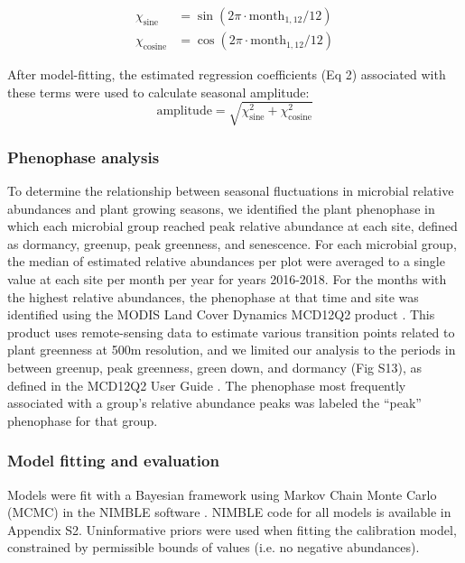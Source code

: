 \documentclass[11pt]{article}
\begin{document}
\begin{align}
\chi_\text{sine} &= \sin(2 \pi \cdot \text{month}_{1,12} / 12) \label{eq:sin_encoding} \\
\chi_\text{cosine} &= \cos(2 \pi \cdot \text{month}_{1,12} / 12) \label{eq:cos_encoding}
\end{align}


After model-fitting, the estimated regression coefficients (Eq 2) associated with these terms were used to calculate seasonal amplitude: \\

\begin{equation}
\text{amplitude} = \sqrt{\chi_\text{sine}^2 + \chi_\text{cosine}^2}
\label{eq:amplitude}
\end{equation}


\subsubsection{Phenophase analysis}

To determine the relationship between seasonal fluctuations in microbial relative abundances and plant growing seasons, we identified the plant phenophase in which each microbial group reached peak relative abundance at each site, defined as dormancy, greenup, peak greenness, and senescence. For each microbial group, the median of estimated relative abundances per plot were averaged to a single value at each site per month per year for years 2016-2018. For the months with the highest relative abundances, the phenophase at that time and site was identified using the MODIS Land Cover Dynamics MCD12Q2 product \cite{gray_user_nodate}. This product uses remote-sensing data to estimate various transition points related to plant greenness at 500m resolution, and we limited our analysis to the periods in between greenup, peak greenness, green down, and dormancy (Fig S13), as defined in the MCD12Q2 User Guide \cite{gray_user_nodate}. The phenophase most frequently associated with a group’s relative abundance peaks was labeled the “peak” phenophase for that group.

\subsubsection{Model fitting and evaluation}

Models were fit with a Bayesian framework using Markov Chain Monte Carlo (MCMC) in the NIMBLE software \cite{de_valpine_programming_2017}. NIMBLE code for all models is available in Appendix S2. Uninformative priors were used when fitting the calibration model, constrained by permissible bounds of values (i.e. no negative abundances).
\end{document}
